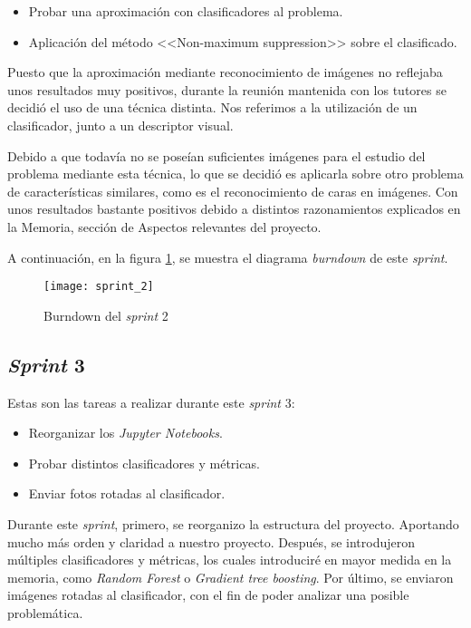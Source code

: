 \begin{itemize}
	\item Probar una aproximación con clasificadores al problema.
	\item Aplicación del método <<Non-maximum suppression>> sobre el clasificado.
\end{itemize}

Puesto que la aproximación mediante reconocimiento de imágenes no reflejaba unos resultados muy positivos, durante la reunión mantenida con los tutores se decidió el uso de una técnica distinta. Nos referimos a la utilización  de un clasificador, junto a un descriptor visual.

Debido a que todavía no se poseían suficientes imágenes para el estudio del problema mediante esta técnica, lo que se decidió es aplicarla sobre otro problema de características similares, como es el reconocimiento de caras en imágenes. Con unos resultados bastante positivos debido a distintos razonamientos explicados en la Memoria, sección de Aspectos relevantes del proyecto.

A continuación, en la figura \ref{fig:A.1.3}, se muestra el diagrama \textit{burndown} de este \textit{sprint}.

\begin{figure}
\centering
\texttt{[image: sprint\_2]}
\caption{Burndown del \textit{sprint} 2}
\label{fig:A.1.3}
\end{figure}

\subsection{\textit{Sprint} 3}
Estas son las tareas a realizar durante este \textit{sprint} 3:

\begin{itemize}
	\item Reorganizar los \textit{Jupyter Notebooks}.
	\item Probar distintos clasificadores y métricas.
	\item Enviar fotos rotadas al clasificador.
\end{itemize}

Durante este \textit{sprint}, primero, se reorganizo la estructura del proyecto. Aportando mucho más orden y claridad a nuestro proyecto. Después, se introdujeron múltiples clasificadores y métricas, los cuales introduciré en mayor medida en la memoria, como \textit{Random Forest}\cite{random forest} o \textit{Gradient tree boosting}\cite{gradientboosting}. Por último, se enviaron imágenes rotadas al clasificador, con el fin de poder analizar una posible problemática.

